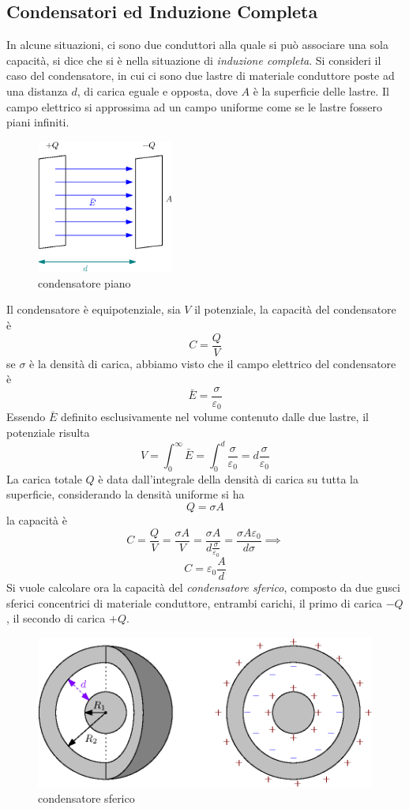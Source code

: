 \documentclass[10pt, letterpaper]{report}
\begin{document}
\subsection{Condensatori ed Induzione Completa}
In alcune situazioni, ci sono due conduttori alla quale si può associare una sola capacità, si dice che si è nella situazione di \textit{induzione completa}. Si consideri il caso del condensatore, in cui ci sono due lastre di materiale conduttore poste ad una distanza $d$, di carica eguale e opposta, dove $A$ è la superficie delle lastre. Il campo elettrico si approssima ad un campo uniforme come se le lastre fossero piani infiniti.\begin{figure}[h!]
    \centering
    \includegraphics[width=0.4\textwidth]{images/condensatore.eps}
    \caption{condensatore piano}
\end{figure}
Il condensatore è equipotenziale, sia $V$ il potenziale, la capacità del condensatore è 
$$ C=\frac{Q}{V}$$
se $\sigma$ è la densità di carica, abbiamo visto che il campo elettrico del condensatore è 
$$ \bar E = \frac{\sigma}{\varepsilon_0}$$Essendo $\bar E$ definito esclusivamente nel volume contenuto dalle due lastre, il potenziale risulta
$$  V = \int_0^\infty\bar E=\int_0^d\frac{\sigma}{\varepsilon_0}=    d\frac{\sigma}{\varepsilon_0}$$
La carica totale $Q$ è data dall'integrale della densità di carica su tutta la superficie, considerando la densità uniforme si ha $$Q=\sigma A$$
la capacità è $$ C=\frac{Q}{ V}=\frac{\sigma A}{ V}=\frac{\sigma A }{d \frac{\sigma}{\varepsilon_0}}=\frac{\sigma A \varepsilon_0}{d \sigma}\implies $$
$$ C=\varepsilon_0\frac{A}{d}$$ 
Si vuole calcolare ora la capacità del \textit{condensatore sferico}, composto da due gusci sferici concentrici di materiale conduttore, entrambi carichi, il primo di carica $-Q$, il secondo di carica $+Q$.\begin{figure}[h!]
    \centering
    \includegraphics[width=1\textwidth]{images/condensatoreSferico.eps}
    \caption{condensatore sferico}
\end{figure}
\end{document}
